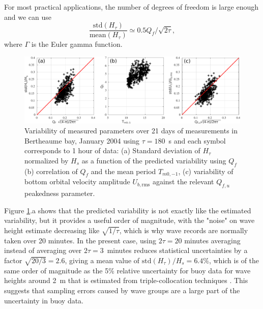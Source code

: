 {For most practical applications, the number of degrees of freedom is large enough and we can use
\begin{equation}
\frac{\mathrm{std}(H_\tau)}{\mathrm{mean}(H_\tau)} \simeq 0.5  Q_f / \sqrt{ 2 \tau },
   \label{eq:groups_var_1DY}
\end{equation}
where $\Gamma$ is the Euler gamma function. 

\begin{figure}[htb]
\centerline{\includegraphics[width=\textwidth]{FIGS_CH_GROUPS/Qf_test.pdf}}
  \caption{Variability of measured parameters over 21 days of measurements in Bertheaume bay, January 2004 using $\tau=180$~s and each symbol corresponds to 1 hour of data: (a) Standard deviation of $H_{\tau}$ normalized by $H_s$ as a function  of the predicted variability using $Q_f$ (b) correlation of $Q_f$ and the mean period $T_{m0,-1}$, (c) variability of bottom orbital velocity amplitude $U_{b,\mathrm{rms}}$ against the relevant $Q_{f,u}$ peakedness parameter.}
\label{fig:groupsQf}
\end{figure}
Figure \ref{fig:groupsQf}.a shows that the predicted variability is not exactly like the estimated variability, but it provides a useful order of magnitude, with the "noise" on wave height estimate decreasing like $\sqrt{1/\tau}$, which is why wave records are normally taken over 20 minutes. In the present case, using $2\tau = 20$ minutes averaging instead of averaging over $2\tau = 3$~minutes reduces statistical uncertainties by a factor $\sqrt{20/3}=2.6$, giving a mean value of $\mathrm{std}(H_\tau)/ H_s=6.4\%$, which is of the same order of magnitude as the 5\% relative uncertainty for buoy data for wave heights around 2~m  that is estimated from triple-collocation techniques \citep{Dodet&al.2022}. This suggests that sampling errors caused by wave groups are a large part of the uncertainty in buoy data.

}
